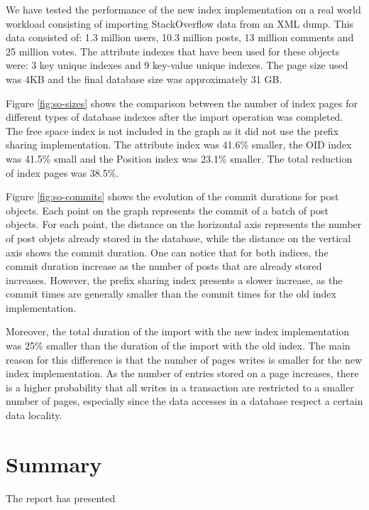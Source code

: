 \documentclass[11pt,a4paper,oneside]{article}
\begin{document}
We have tested the performance of the new index implementation on a real world workload consisting of importing StackOverflow data from an XML dump. This data consisted of: 1.3 million users, 10.3 million posts, 13 million comments and 25 million votes. The attribute indexes that have been used for these objects were: 3 key unique indexes and 9 key-value unique indexes. The page size used was 4KB and the final database size was approximately 31 GB. 

Figure \ref{fig:so-sizes} shows the comparison between the number of index pages for different types of database indexes after the import operation was completed. The free space index is not included in the graph as it did not use the prefix sharing implementation. The attribute index was 41.6\% smaller, the OID index was 41.5\% small and the Position index was 23.1\% smaller. The total reduction of index pages was 38.5\%. 

Figure \ref{fig:so-commits} shows the evolution of the commit durations for post objects. Each point on the graph represents the commit of a batch of post objects. For each point, the distance on the horizontal axis represents the number of post objets already stored in the database, while the distance on the vertical axis shows the commit duration. One can notice that for both indices, the commit duration increase as the number of posts that are already stored increases. However, the prefix sharing index presents a slower increase, as the commit times are generally smaller than the commit times for the old index implementation. 

Moreover, the total duration of the import with the new index implementation was 25\% smaller than the duration of the import with the old index. The main reason for this difference is that the number of pages writes is smaller for the new index implementation. As the number of entries stored on a page increases, there is a higher probability that all writes in a transaction are restricted to a smaller number of pages, especially since the data accesses in a database respect a certain data locality.

\section{Summary} %
\label{sec:summary}

The report has presented 
\end{document}
